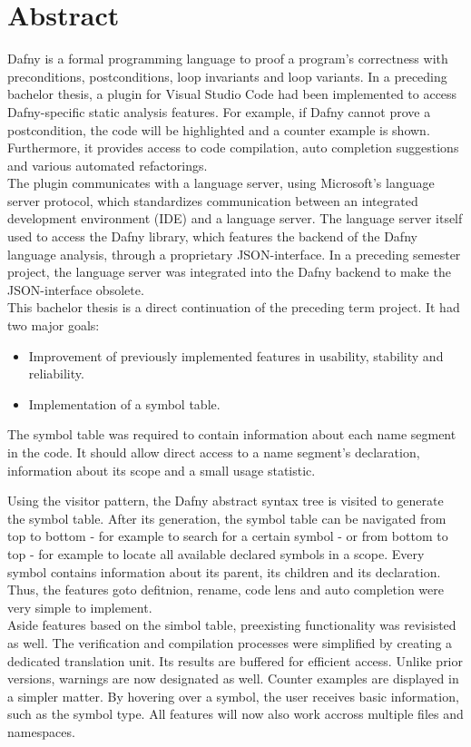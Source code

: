 \section{Abstract}
Dafny is a formal programming language to proof a program's correctness with preconditions, postconditions, loop invariants and loop variants. In a preceding bachelor thesis, a plugin for Visual Studio Code had been implemented to access Dafny-specific static analysis features. For example, if Dafny cannot prove a postcondition, the code will be highlighted and a counter example is shown. Furthermore, it provides access to code compilation, auto completion suggestions and various automated refactorings.\\

The plugin communicates with a language server, using Microsoft's language server protocol, which standardizes communication between an integrated development environment (IDE) and a language server.  The language server itself used to access the Dafny library, which features the backend of the Dafny language analysis, through a proprietary JSON-interface. In a preceding semester project, the language server was integrated into the Dafny backend to make the JSON-interface obsolete.\\

This bachelor thesis is a direct continuation of the preceding term project. It had two major goals:
\begin{itemize}
    \item Improvement of previously implemented features in usability, stability and reliability.
    \item Implementation of a symbol table.
\end{itemize}
The symbol table was required to contain information about each name segment in the code. It should allow direct access to a name segment's declaration, information about its scope and a small usage statistic.

Using the visitor pattern, the Dafny abstract syntax tree is visited to generate the symbol table. After its generation, the symbol table can be navigated from top to bottom - for example to search for a certain symbol - or from bottom to top - for example to locate all available declared symbols in a scope. Every symbol contains information about its parent, its children and its declaration. Thus, the features goto defitnion, rename, code lens and auto completion were very simple to implement.\\

Aside features based on the simbol table, preexisting functionality was revisisted as well. The verification and compilation processes were simplified by creating a dedicated translation unit. Its results are buffered for efficient access. Unlike prior versions, warnings are now designated as well. Counter examples are displayed in a simpler matter. By hovering over a symbol, the user receives basic information, such as the symbol type. All features will now also work accross multiple files and namespaces.